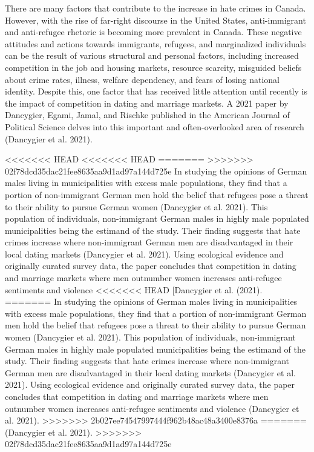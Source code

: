 \documentclass[
]{article}
\begin{document}
There are many factors that contribute to the increase in hate crimes in
Canada. However, with the rise of far-right discourse in the United
States, anti-immigrant and anti-refugee rhetoric is becoming more
prevalent in Canada. These negative attitudes and actions towards
immigrants, refugees, and marginalized individuals can be the result of
various structural and personal factors, including increased competition
in the job and housing markets, resource scarcity, misguided beliefs
about crime rates, illness, welfare dependency, and fears of losing
national identity. Despite this, one factor that has received little
attention until recently is the impact of competition in dating and
marriage markets. A 2021 paper by Dancygier, Egami, Jamal, and Rischke
published in the American Journal of Political Science delves into this
important and often-overlooked area of research (Dancygier et al. 2021).

<<<<<<< HEAD
\textless\textless\textless\textless\textless\textless\textless{} HEAD
=======
>>>>>>> 02f78dcd35dac21fee8635aa9d1ad97a144d725e
In studying the opinions of German males living in municipalities with
excess male populations, they find that a portion of non-immigrant
German men hold the belief that refugees pose a threat to their ability
to pursue German women (Dancygier et al. 2021). This population of
individuals, non-immigrant German males in highly male populated
municipalities being the estimand of the study. Their finding suggests
that hate crimes increase where non-immigrant German men are
disadvantaged in their local dating markets (Dancygier et al. 2021).
Using ecological evidence and originally curated survey data, the paper
concludes that competition in dating and marriage markets where men
outnumber women increases anti-refugee sentiments and violence
<<<<<<< HEAD
{[}Dancygier et al. (2021). ======= In studying the opinions of German
males living in municipalities with excess male populations, they find
that a portion of non-immigrant German men hold the belief that refugees
pose a threat to their ability to pursue German women (Dancygier et al.
2021). This population of individuals, non-immigrant German males in
highly male populated municipalities being the estimand of the study.
Their finding suggests that hate crimes increase where non-immigrant
German men are disadvantaged in their local dating markets (Dancygier et
al. 2021). Using ecological evidence and originally curated survey data,
the paper concludes that competition in dating and marriage markets
where men outnumber women increases anti-refugee sentiments and violence
(Dancygier et al. 2021).
\textgreater\textgreater\textgreater\textgreater\textgreater\textgreater\textgreater{}
2b027ee74547997444f962b48ac48a3400e8376a
=======
(Dancygier et al. 2021).
>>>>>>> 02f78dcd35dac21fee8635aa9d1ad97a144d725e
\end{document}
